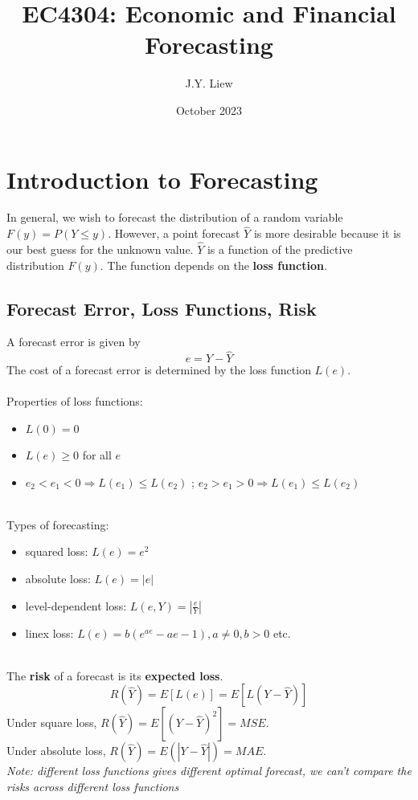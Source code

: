 \documentclass{article}
\title{EC4304: Economic and Financial Forecasting}
\author{J.Y. Liew}
\date{October 2023}
\begin{document}
\maketitle

\section{Introduction to Forecasting}
In general, we wish to forecast the distribution of a random variable $F(y) = P(Y \leq y)$. However, a point forecast $\hat{Y}$ is more desirable because it  is our best guess for the unknown value. $\hat{Y}$ is a function of the predictive distribution $F(y)$. The function depends on the \textbf{loss function}.

\subsection{Forecast Error, Loss Functions, Risk}
A forecast error is given by 
$$e = Y-\hat{Y}$$
The cost of a forecast error is determined by the loss function $L(e)$.\\
\\
Properties of loss functions:
\begin{itemize}
    \item $L(0) = 0$
    \item $L(e) \geq 0$ for all $e$
    \item $e_2 < e_1 < 0 \Rightarrow L(e_1) \leq L(e_2)$ ; $e_2 > e_1 > 0 \Rightarrow L(e_1) \leq L(e_2)$
\end{itemize}
\\
Types of forecasting:
\begin{itemize}
    \item squared loss: $L(e) = e^2$
    \item absolute loss: $L(e) = |e|$
    \item level-dependent loss: $L(e, Y) = |\frac{e}{Y}|$
    \item linex loss: $L(e) = b(e^{ae}-ae-1), a \neq 0, b > 0$ etc.
\end{itemize}
\\
The \textbf{risk} of a forecast is its \textbf{expected loss}.
$$R(\hat{Y}) = E[L(e)] = E[L(Y-\hat{Y})]$$
Under square loss, $R(\hat{Y}) = E[(Y - \hat{Y})^2] = MSE$.\\
Under absolute loss, $R(\hat{Y}) = E(|Y - \hat{Y}|) = MAE$.\\
{\center \small{\textit{Note: different loss functions gives different optimal forecast, we can't compare the risks across different loss functions}}}
\end{document}
